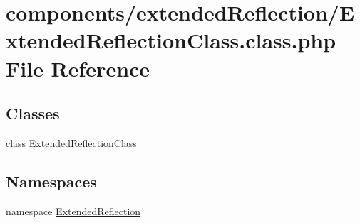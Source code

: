 \hypertarget{_extended_reflection_class_8class_8php}{
\section{components/extendedReflection/ExtendedReflectionClass.class.php File Reference}
\label{_extended_reflection_class_8class_8php}
}
\subsection*{Classes}
\begin{CompactItemize}
\item 
class \hyperlink{class_extended_reflection_class}{ExtendedReflectionClass}
\end{CompactItemize}
\subsection*{Namespaces}
\begin{CompactItemize}
\item 
namespace \hyperlink{namespace_extended_reflection}{ExtendedReflection}
\end{CompactItemize}
